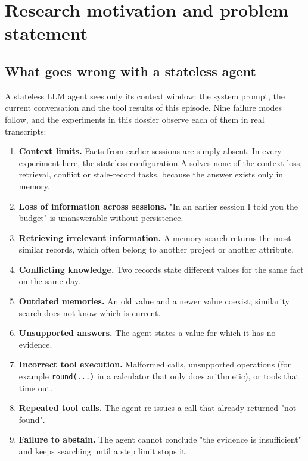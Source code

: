 \documentclass[10.5pt,a4paper,oneside]{report}
\begin{document}
\chapter{Research motivation and problem statement}
\section{What goes wrong with a stateless agent}
A stateless LLM agent sees only its context window: the system prompt, the current conversation and the tool results of this episode. Nine failure modes follow, and the experiments in this dossier observe each of them in real transcripts:

\begin{enumerate}
\item \textbf{Context limits.} Facts from earlier sessions are simply absent. In every experiment here, the stateless configuration A solves none of the context-loss, retrieval, conflict or stale-record tasks, because the answer exists only in memory.
\item \textbf{Loss of information across sessions.} "In an earlier session I told you the budget" is unanswerable without persistence.
\item \textbf{Retrieving irrelevant information.} A memory search returns the most similar records, which often belong to another project or another attribute.
\item \textbf{Conflicting knowledge.} Two records state different values for the same fact on the same day.
\item \textbf{Outdated memories.} An old value and a newer value coexist; similarity search does not know which is current.
\item \textbf{Unsupported answers.} The agent states a value for which it has no evidence.
\item \textbf{Incorrect tool execution.} Malformed calls, unsupported operations (for example \texttt{round(.\allowbreak{}.\allowbreak{}.\allowbreak{})} in a calculator that only does arithmetic), or tools that time out.
\item \textbf{Repeated tool calls.} The agent re-issues a call that already returned "not found".
\item \textbf{Failure to abstain.} The agent cannot conclude "the evidence is insufficient" and keeps searching until a step limit stops it.
\end{enumerate}
\end{document}
